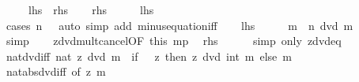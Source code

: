 \begin{isabellebody}
\ \ \ \ {\isacharparenleft}{\kern0pt}\ {\isachardoublequoteopen}{\isacharquery}{\kern0pt}lhs\ {\isasymlongleftrightarrow}\ {\isacharquery}{\kern0pt}rhs{\isachardoublequoteclose}{\isacharparenright}{\kern0pt}\isanewline
%
\isadelimproof
%
\endisadelimproof
%
\isatagproof
{}\isamarkupfalse%
\isanewline
\ \ \isamarkupfalse%
\ {\isacharquery}{\kern0pt}rhs\isanewline
\ \ \isamarkupfalse%
\ \isamarkupfalse%
\ {\isacharquery}{\kern0pt}lhs\isanewline
\ \ \ \ \isamarkupfalse%
\ {\isacharparenleft}{\kern0pt}cases\ {\isachardoublequoteopen}n\ {\isachargreater}{\kern0pt}\ {}{\isachardoublequoteclose}{\isacharparenright}{\kern0pt}\ {\isacharparenleft}{\kern0pt}auto\ simp\ add{\isacharcolon}{\kern0pt}\ minus{\isacharunderscore}{\kern0pt}equation{\isacharunderscore}{\kern0pt}iff{\isacharparenright}{\kern0pt}\isanewline
{}\isamarkupfalse%
\isanewline
\ \ \isamarkupfalse%
\ {\isacharquery}{\kern0pt}lhs\isanewline
\ \ \isamarkupfalse%
\ \isamarkupfalse%
\ {\isachardoublequoteopen}m\ {\isacharasterisk}{\kern0pt}\ n\ dvd\ m\ {\isacharasterisk}{\kern0pt}\ {}{\isachardoublequoteclose}\ \isamarkupfalse%
\ simp\isanewline
\ \ \isamarkupfalse%
\ zdvd{\isacharunderscore}{\kern0pt}mult{\isacharunderscore}{\kern0pt}cancel{\isacharbrackleft}{\kern0pt}OF\ this\ mp{\isacharbrackright}{\kern0pt}\ \isamarkupfalse%
\ {\isacharquery}{\kern0pt}rhs\isanewline
\ \ \ \ \isamarkupfalse%
\ {\isacharparenleft}{\kern0pt}simp\ only{\isacharcolon}{\kern0pt}\ zdvd{}{\isacharunderscore}{\kern0pt}eq{\isacharparenright}{\kern0pt}\isanewline
{}\isamarkupfalse%
%
\endisatagproof
{\isafoldproof}%
%
\isadelimproof
\isanewline
%
\endisadelimproof
\isanewline
{}\isamarkupfalse%
\ nat{\isacharunderscore}{\kern0pt}dvd{\isacharunderscore}{\kern0pt}iff{\isacharcolon}{\kern0pt}\ {\isachardoublequoteopen}nat\ z\ dvd\ m\ {\isasymlongleftrightarrow}\ {\isacharparenleft}{\kern0pt}if\ {}\ {\isasymle}\ z\ then\ z\ dvd\ int\ m\ else\ m\ {\isacharequal}{\kern0pt}\ {}{\isacharparenright}{\kern0pt}{\isachardoublequoteclose}\isanewline
%
\isadelimproof
\ \ %
\endisadelimproof
%
\isatagproof
{}\isamarkupfalse%
\ nat{\isacharunderscore}{\kern0pt}abs{\isacharunderscore}{\kern0pt}dvd{\isacharunderscore}{\kern0pt}iff\ {\isacharbrackleft}{\kern0pt}of\ z\ m{\isacharbrackright}{\kern0pt}\ \isamarkupfalse%

\end{isabellebody}
